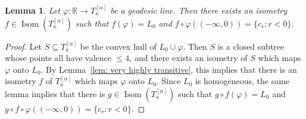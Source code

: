 \documentclass[11pt]{article}
\DeclareMathOperator{\Isom}{Isom}
\newtheorem{lemma}[theorem]{Lemma}
\theoremstyle{definition}
\theoremstyle{remark}
\begin{document}
\begin{lemma} \label{lem: order preserving isom}
    Let $\varphi: \mathbb{R} \rightarrow T_\kappa^{[\alpha]}$ be a geodesic line. Then there exists an isometry $f \in \Isom(T_\kappa^{[\alpha]})$ such that $f(\varphi) = L_0$ and $f \circ \varphi((-\infty,0)) = \{c_r : r < 0\}$.
\end{lemma}
\begin{proof}
    Let $S \subseteq T_\kappa^{[\alpha]}$ be the convex hull of $L_0 \cup \varphi$. Then $S$ is a closed subtree whose points all have valence $\leq 4$, and there exists an isometry of $S$ which maps $\varphi$ onto $L_0$. By Lemma~\ref{lem: very highly transitive}, this implies that there is an isometry $f$ of $T_\kappa^{[\alpha]}$ which maps $\varphi$ onto $L_0$. Since $L_0$ is homogeneous, the same lemma implies that there is $g \in \Isom(T_\kappa^{[\alpha]})$ such that $g \circ f (\varphi) = L_0$ and $g \circ f \circ \varphi((-\infty,0)) = \{c_r : r < 0\}$.
\end{proof}
\end{document}
